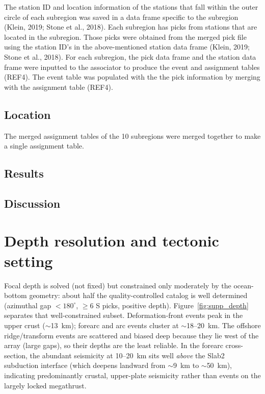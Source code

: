 \documentclass[]{seismica}
\begin{document}
The station ID and location information of the stations that fall within the outer circle of each subregion was saved in a data frame specific to the subregion (Klein, 2019; Stone et al., 2018). Each subregion has picks from stations that are located in the subregion. Those picks were obtained from the merged pick file using the station ID’s in the above-mentioned station data frame (Klein, 2019; Stone et al., 2018). 
For each subregion, the pick data frame and the station data frame were inputted to the associator to produce the event and assignment tables (REF4). The event table was populated with the the pick information by merging with the assignment table (REF4).

\subsection{Location}

The merged assignment tables of the 10 subregions were merged together to make a single assignment table. 

\subsection{Results}

\subsection{Discussion}

\section{Depth resolution and tectonic setting}

Focal depth is solved (not fixed) but constrained only moderately by the
ocean-bottom geometry: about half the quality-controlled catalog is well determined
(azimuthal gap $<180^\circ$, $\ge 6$ S picks, positive depth). Figure~\ref{fig:supp_depth}
separates that well-constrained subset. Deformation-front events peak in the upper
crust ($\sim$13~km); forearc and arc events cluster at $\sim$18--20~km. The offshore
ridge/transform events are scattered and biased deep because they lie west of the
array (large gaps), so their depths are the least reliable. In the forearc
cross-section, the abundant seismicity at 10--20~km sits well \emph{above} the Slab2
subduction interface (which deepens landward from $\sim$9~km to $\sim$50~km), indicating
predominantly crustal, upper-plate seismicity rather than events on the largely locked
megathrust.
\end{document}
